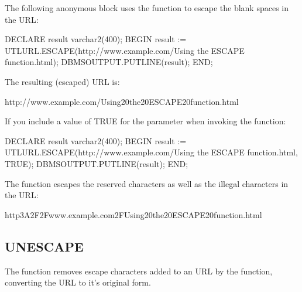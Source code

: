 \documentclass[letterpaper,10pt,english,openany,oneside]{sphinxmanual}
\begin{document}

The following anonymous block uses the  function to escape the
blank spaces in the URL:

%
\begin{sphinxVerbatim}[commandchars=\\\{\}]
DECLARE
result varchar2(400);
BEGIN
result := UTL\PYGZus{}URL.ESCAPE(\PYGZsq{}http://www.example.com/Using the ESCAPE function.html\PYGZsq{});
DBMS\PYGZus{}OUTPUT.PUT\PYGZus{}LINE(result);
END;
\end{sphinxVerbatim}

The resulting (escaped) URL is:

%
\begin{sphinxVerbatim}[commandchars=\\\{\}]
http://www.example.com/Using\PYGZpc{}20the\PYGZpc{}20ESCAPE\PYGZpc{}20function.html
\end{sphinxVerbatim}

If you include a value of TRUE for the  parameter when invoking the function:

%
\begin{sphinxVerbatim}[commandchars=\\\{\}]
DECLARE
result varchar2(400);
BEGIN
result := UTL\PYGZus{}URL.ESCAPE(\PYGZsq{}http://www.example.com/Using the ESCAPE function.html\PYGZsq{}, TRUE);
DBMS\PYGZus{}OUTPUT.PUT\PYGZus{}LINE(result);
END;
\end{sphinxVerbatim}

The  function escapes the reserved characters as well as the illegal characters in the URL:

%
\begin{sphinxVerbatim}[commandchars=\\\{\}]
http\PYGZpc{}3A\PYGZpc{}2F\PYGZpc{}2Fwww.example.com\PYGZpc{}2FUsing\PYGZpc{}20the\PYGZpc{}20ESCAPE\PYGZpc{}20function.html
\end{sphinxVerbatim}


\subsection{UNESCAPE}
\label{\detokenize{utl_url:unescape}}
The  function removes escape characters added to an URL by the
 function, converting the URL to it’s original form.
\end{document}
